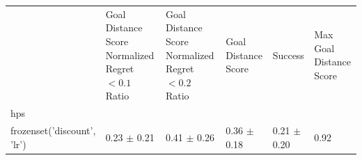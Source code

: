 \begin{tabular}{llllll}
\toprule
 & Goal Distance Score Normalized Regret $< 0.1$ Ratio & Goal Distance Score Normalized Regret $< 0.2$ Ratio & Goal Distance Score & Success & Max Goal Distance Score \\
hps &  &  &  &  &  \\
\midrule
frozenset({'discount', 'lr'}) & 0.23 $\pm$ 0.21 & 0.41 $\pm$ 0.26 & 0.36 $\pm$ 0.18 & 0.21 $\pm$ 0.20 & 0.92 \\
\bottomrule
\end{tabular}
